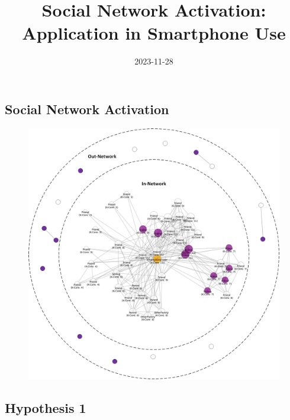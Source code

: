 \documentclass[
  letterpaper,
  DIV=11,
  numbers=noendperiod]{scrartcl}
\title{Social Network Activation: \The Application in Smartphone Use}
\author{}
\date{2023-11-28}
\begin{document}
\maketitle
\ifdefined\Shaded\renewenvironment{Shaded}{\begin{tcolorbox}[interior hidden, enhanced, sharp corners, borderline west={3pt}{0pt}{shadecolor}, breakable, boxrule=0pt, frame hidden]}{\end{tcolorbox}}\fi

\hypertarget{social-network-activation}{%
\subsection{Social Network Activation}\label{social-network-activation}}

\begin{figure}

{\centering \includegraphics{inout.png}

}

\end{figure}

\hypertarget{hypothesis-1}{%
\subsection{Hypothesis 1}\label{hypothesis-1}}
\end{document}
